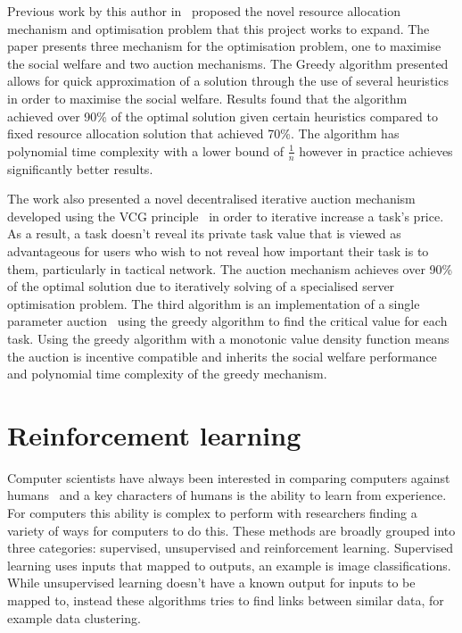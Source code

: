 Previous work by this author in~\cite{FlexibleResourceAllocation} proposed the novel resource allocation mechanism and
optimisation problem that this project works to expand. The paper presents three mechanism for the optimisation problem,
one to maximise the social welfare and two auction mechanisms. The Greedy algorithm presented allows for quick
approximation of a solution through the use of several heuristics in order to maximise the social welfare. Results
found that the algorithm achieved over 90\% of the optimal solution given certain heuristics compared to fixed
resource allocation solution that achieved 70\%. The algorithm has polynomial time complexity with a lower bound of
$\frac{1}{n}$ however in practice achieves significantly better results.

The work also presented a novel decentralised iterative auction mechanism developed using the VCG
principle~\citep{vickrey, Clarke, groves} in order to iterative increase a task's price. As a result, a task doesn't
reveal its private task value that is viewed as advantageous for users who wish to not reveal how important their task
is to them, particularly in tactical network. The auction mechanism achieves over 90\% of the optimal solution due to
iteratively solving of a specialised server optimisation problem. The third algorithm is an implementation of a single
parameter auction~\citep{nisan2007algorithmic_critical_value} using the greedy algorithm to find the critical value for
each task. Using the greedy algorithm with a monotonic value density function means the auction is incentive compatible
and inherits the social welfare performance and polynomial time complexity of the greedy mechanism.

\section{Reinforcement learning}\label{sec:reinforcement-learning}
Computer scientists have always been interested in comparing computers against humans~\citep{turing1950computing} and a
key characters of humans is the ability to learn from experience. For computers this ability is complex to perform with
researchers finding a variety of ways for computers to do this. These methods are broadly grouped into three categories:
supervised, unsupervised and reinforcement learning. Supervised learning uses inputs that mapped to outputs, an example
is image classifications. While unsupervised learning doesn't have a known output for inputs to be mapped to, instead
these algorithms tries to find links between similar data, for example data clustering.

